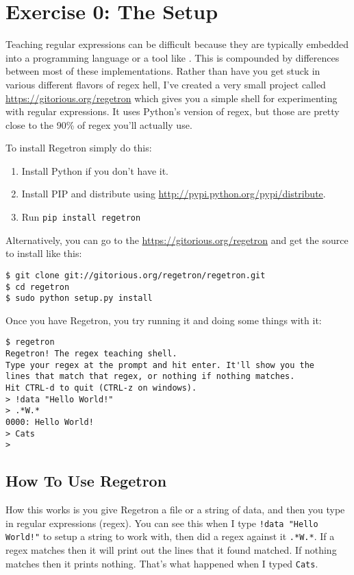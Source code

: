 \chapter{Exercise 0: The Setup}

Teaching regular expressions can be difficult because they are typically embedded into 
a programming language or a tool like .  This is compounded by differences
between most of these implementations.  Rather than have you get stuck in various 
different flavors of regex hell, I've created a very small project called 
\href{Regetron}{https://gitorious.org/regetron} which gives you a simple shell
for experimenting with regular expressions.  It uses Python's version of regex, but
those are pretty close to the 90\% of regex you'll actually use.

To install Regetron simply do this:

\begin{enumerate}
\item Install Python if you don't have it.
\item Install PIP and distribute using \href{http://pypi.python.org/pypi/distribute}{http://pypi.python.org/pypi/distribute}.
\item Run \verb|pip install regetron|
\end{enumerate}

Alternatively, you can go to the \href{Regetron project page}{https://gitorious.org/regetron}
and get the source to install like this:

\begin{lstlisting}
$ git clone git://gitorious.org/regetron/regetron.git
$ cd regetron
$ sudo python setup.py install
\end{lstlisting}

Once you have Regetron, you try running it and doing some things with it:

\begin{lstlisting}
$ regetron
Regetron! The regex teaching shell.
Type your regex at the prompt and hit enter. It'll show you the
lines that match that regex, or nothing if nothing matches.
Hit CTRL-d to quit (CTRL-z on windows).
> !data "Hello World!"
> .*W.*
0000: Hello World!
> Cats
> 
\end{lstlisting}


\section{How To Use Regetron}

How this works is you give Regetron a file or a string of data, and then you
type in regular expressions (regex).  You can see this when I type \verb|!data "Hello World!"|
to setup a string to work with, then did a regex against it
\verb|.*W.*|.  If a regex matches then it will print out the lines that it
found matched.  If nothing matches then it prints nothing.  That's what 
happened when I typed \verb|Cats|.

